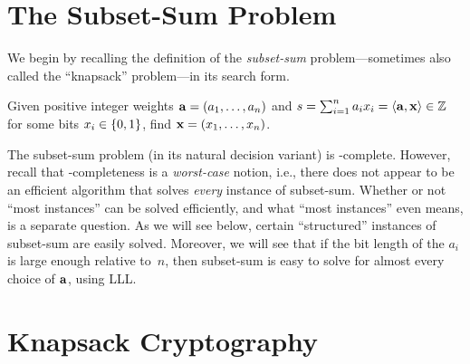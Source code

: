 \documentclass[11pt]{article}
\begin{document}
\thispagestyle{fancy}           %


\section{The Subset-Sum Problem}
\label{sec:knapsack}

We begin by recalling the definition of the \emph{subset-sum}
problem---sometimes also called the ``knapsack'' problem---in its
search form.

\begin{definition}
  \label{def:subset-sum}
  Given positive integer weights $\mathbf{a}=(a_1,\ldots,a_n)$ and
  $s=\sum_{i=1}^n a_i x_i = \langle\mathbf{a},\mathbf{x}\rangle \in \mathbb{Z}$ for some bits
  $x_i \in \{0,1\}$, find $\mathbf{x}=(x_1,\ldots,x_n)$.
\end{definition}

The subset-sum problem (in its natural decision variant) is
\NP-complete. However, recall that \NP-completeness is a
\emph{worst-case} notion, i.e., there does not appear to be an
efficient algorithm that solves \emph{every} instance of subset-sum.
Whether or not ``most instances'' can be solved efficiently, and what
``most instances'' even means, is a separate question. As we will see
below, certain ``structured'' instances of subset-sum are easily
solved. Moreover, we will see that if the bit length of the $a_{i}$ is
large enough relative to~$n$, then subset-sum is easy to solve for
almost every choice of $\mathbf{a}$, using LLL.

\section{Knapsack Cryptography}
\label{sec:knapsack-crypto}
\end{document}
